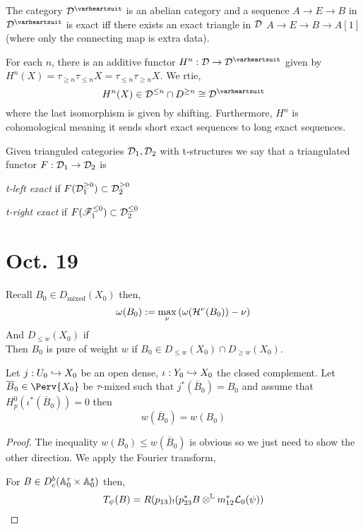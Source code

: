 \documentclass[12pt]{article}
\newcommand{\heart}{\ensuremath\varheartsuit}
\begin{document}
\begin{thm}
The category $\D^{\heart}$ is an abelian category and a sequence $A \to E \to B$ in $\D^{\heart}$ is exact iff there exists an exact triangle in $\mathcal{D}$ $A \to E \to B \to A[1]$ (where only the connecting map is extra data).
\end{thm}

\begin{thm}
For each $n$, there is an additive functor $H^n : \D \to \D^{\heart}$ given by $H^n(X) = \tau_{\ge n} \tau_{\le n} X = \tau_{\le n} \tau_{\ge n} X$. We rtie,
\[ H^n(X) \in \D^{\le n} \cap D^{\ge n} \cong \D^\heart \]
where the last isomorphism is given by shifting. Furthermore, $H^n$ is cohomological meaning it sends short exact sequences to long exact sequences.
\end{thm}

\begin{defn}
Given trianguled categories $\mathcal{D}_1, \mathcal{D}_2$ with t-structures we say that a triangulated functor $F : \mathcal{D}_1 \to \mathcal{D}_2$ is 
\begin{center}
\item \textit{t-left exact} if $F(\mathcal{D}_1^{\ge 0}) \subset \mathcal{D}_2^{\ge 0}$
\item \textit{t-right exact} if $F(\mathscr{F}_1^{\le 0}) \subset \mathcal{D}_2^{\le 0}$
\end{center}
\end{defn}

\section{Oct. 19}

Recall $B_0 \in D_{\text{mixed}}(X_0)$ then,
\[ \omega(B_0) := \max_{\nu} \left( \omega(\mathcal{H}^\nu(B_0)) - \nu \right) \]
And $D_{\le w}(X_0)$ if 
\bigskip\\
Then $B_0$ is pure of weight $w$ if $B_0 \in D_{\le w}(X_0) \cap D_{\ge w}(X_0)$.

\begin{lemma}
Let $j : U_0 \hookrightarrow X_0$ be an open dense, $\iota : Y_0 \hookrightarrow X_0$ the closed complement. Let $\overline{B}_0 \in \Perv{X_0}$ be $\tau$-mixed such that $j^*(\overline{B}_0) = B_0$ and assume that $H_p^0(\iota^* (\overline{B}_0)) = 0$ then
\[ w(\overline{B}_0) = w(B_0) \]
\end{lemma}

\begin{proof}
The inequality $w(B_0) \le w(\overline{B}_0)$ is obvious so we just need to show the other direction. We apply the Fourier transform,
\begin{center}
\end{center}
For $B \in D_c^b(\mathbb{A}_0^r \times \mathbb{A}_0^s)$ then,
\[ T_\psi(B) = R (p_{13})_! (p_{23}^* B \otimes^{\mathbb{L}} m_{12}^* \mathcal{L}_0(\psi)) \]
\end{proof}
\end{document}
